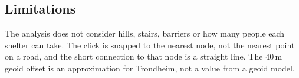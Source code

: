 \subsection{Limitations}

The analysis does not consider hills, stairs, barriers or how many people each shelter can take. The click is snapped to the nearest node, not the nearest point on a road, and the short connection to that node is a straight line. The 40\,m geoid offset is an approximation for Trondheim, not a value from a geoid model.
